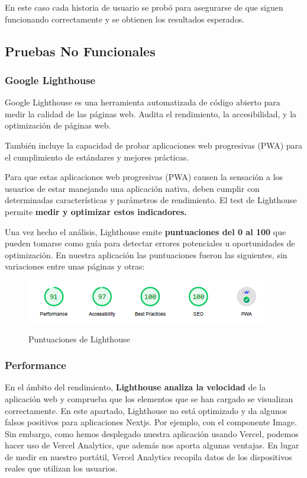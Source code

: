 \documentclass[12pt,twoside,titlepage]{report}
\begin{document}
En este caso cada historia de usuario se probó para asegurarse de que siguen funcionando correctamente y se obtienen los resultados esperados.

\subsection{Pruebas No Funcionales}

\subsubsection{Google Lighthouse}

Google Lighthouse es una herramienta automatizada de código abierto para medir la calidad de las páginas web. Audita el rendimiento, la accesibilidad, y la optimización de páginas web.

También incluye la capacidad de probar aplicaciones web progresivas (PWA) para el cumplimiento de estándares y mejores prácticas.

Para que estas aplicaciones web progresivas (PWA) causen la sensación a los usuarios de estar manejando una aplicación nativa, deben cumplir con determinadas características y parámetros de rendimiento. El test de Lighthouse permite \textbf{medir y optimizar estos indicadores.}

Una vez hecho el análisis, Lighthouse emite \textbf{puntuaciones del 0 al 100} que pueden tomarse como guía para detectar errores potenciales u oportunidades de optimización. En nuestra aplicación las puntuaciones fueron las siguientes, sin variaciones entre unas páginas y otras:

\begin{figure}[H]
    \centering
    \includegraphics[scale=1.2]{Lighthouse/Resumen}
    \label{fig:Lighthouse_resumen}
    \caption{Puntuaciones de Lighthouse}
\end{figure}

\subsubsection{Performance}

En el ámbito del rendimiento, \textbf{Lighthouse analiza la velocidad} de la aplicación web y comprueba que los elementos que se han cargado se visualizan correctamente. En este apartado, Lighthouse no está optimizado y da algunos falsos positivos para aplicaciones Nextjs. Por ejemplo, con el componente Image. Sin embargo, como hemos desplegado nuestra aplicación usando Vercel, podemos hacer uso de Vercel Analytics, que además nos aporta algunas ventajas. En lugar de medir en nuestro portátil, Vercel Analytics recopila datos de los dispositivos reales que utilizan los usuarios. 
\end{document}
